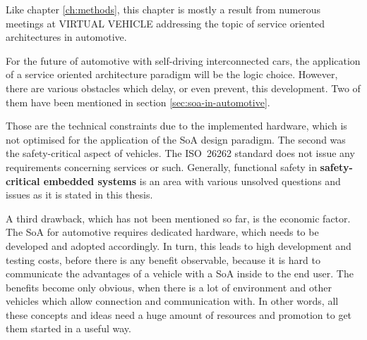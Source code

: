 Like chapter \ref{ch:methods}, this chapter is mostly a result from numerous meetings at VIRTUAL VEHICLE addressing the topic of service oriented architectures in automotive.

For the future of automotive with self-driving interconnected cars, the application of a service oriented architecture paradigm will be the logic choice. However, there are various obstacles which delay, or even prevent, this development. Two of them have been mentioned in section \ref{sec:soa-in-automotive}.

Those are the technical constraints due to the implemented hardware, which is not optimised for the application of the SoA design paradigm. The second was the safety-critical aspect of vehicles. The \mbox{ISO 26262} standard does not issue any requirements concerning services or such. Generally, functional safety in \textbf{safety-critical embedded systems} is an area with various unsolved questions and issues as it is stated in this thesis.

A third drawback, which has not been mentioned so far, is the economic factor. The SoA for automotive requires dedicated hardware, which needs to be developed and adopted accordingly. In turn, this leads to high development and testing costs, before there is any benefit observable, because it is hard to communicate the advantages of a vehicle with a SoA inside to the end user. The benefits become only obvious, when there is a lot of environment and other vehicles which allow connection and communication with. In other words, all these concepts and ideas need a huge amount of resources and promotion to get them started in a useful way.
